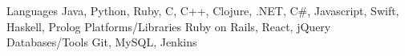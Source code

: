 \begin{cvskills}
  \cvskill
    {Languages}
    {Java, Python, Ruby, C, C++, Clojure, .NET, C\#, Javascript, Swift, Haskell, Prolog}
   \cvskill
    {Platforms/Libraries}
    {Ruby on Rails, React, jQuery}
   \cvskill
    {Databases/Tools}
    {Git, MySQL, Jenkins}
\end{cvskills}
